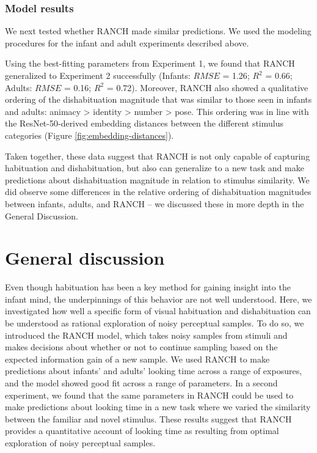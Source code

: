 \documentclass[
]{article}
\begin{document}
\subsubsection{Model results}

We next tested whether RANCH made similar predictions. We used the modeling procedures for the infant and adult experiments described above.

Using the best-fitting parameters from Experiment 1, we found that RANCH generalized to Experiment 2 successfully (Infants: \(RMSE\) = 1.26; \(R^2\) = 0.66; Adults: \(RMSE\) = 0.16; \(R^2\) = 0.72). Moreover, RANCH also showed a qualitative ordering of the dishabituation magnitude that was similar to those seen in infants and adults: animacy \textgreater{} identity \textgreater{} number \textgreater{} pose. This ordering was in line with the ResNet-50-derived embedding distances between the different stimulus categories (Figure \ref{fig:embedding-distances}).

Taken together, these data suggest that RANCH is not only capable of capturing habituation and dishabituation, but also can generalize to a new task and make predictions about dishabituation magnitude in relation to stimulus similarity. We did observe some differences in the relative ordering of dishabituation magnitudes between infants, adults, and RANCH -- we discussed these in more depth in the General Discussion.

\hypertarget{general-discussion}{%
\section{General discussion}\label{general-discussion}}

Even though habituation has been a key method for gaining insight into the infant mind, the underpinnings of this behavior are not well understood. Here, we investigated how well a specific form of visual habituation and dishabituation can be understood as rational exploration of noisy perceptual samples. To do so, we introduced the RANCH model, which takes noisy samples from stimuli and makes decisions about whether or not to continue sampling based on the expected information gain of a new sample. We used RANCH to make predictions about infants' and adults' looking time across a range of exposures, and the model showed good fit across a range of parameters. In a second experiment, we found that the same parameters in RANCH could be used to make predictions about looking time in a new task where we varied the similarity between the familiar and novel stimulus. These results suggest that RANCH provides a quantitative account of looking time as resulting from optimal exploration of noisy perceptual samples. 
\end{document}
